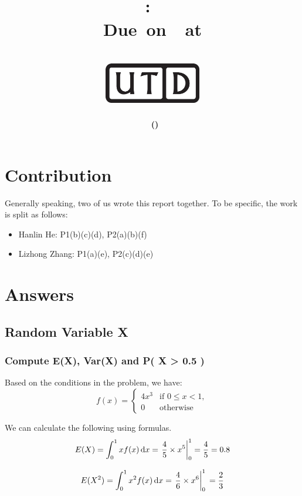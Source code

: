 \documentclass[12pt,letterpaper,titlepage,en-US]{article}
\title{
    \vspace{1in}
    \textmd{\textbf{\hmwkClassName \\\hmwkClass:\ \hmwkTitle }}\\
    \normalsize\vspace{0.1in}\small{Due\ on\ \DTMusedate{DueDate}\ at \DTMusetime{DueDate} }\\
    \vspace{0.1in}\large{\textit{\hmwkClassInstructor}}\\
    \vspace{0.5in}\includegraphics[height=2.4em]{UTD_logo_BW}\\
    \vspace{2in}
}
\author{\textbf{\hmwkAuthorName\ \footnotesize{(\hmwkAuthorNetID)}} \\ }
\date{}
\begin{document}
\maketitle


\tableofcontents

\pagebreak
{}


\section*{Contribution}
Generally speaking, two of us wrote this report together. To be specific, the work is split as follows:
\begin{itemize}
    \item Hanlin He: P1(b)(c)(d), P2(a)(b)(f)
    \item Lizhong Zhang: P1(a)(e), P2(c)(d)(e)
\end{itemize}
\section{Answers}
\subsection{Random Variable X}
\subsubsection{Compute E(X), Var(X) and P( X > 0.5 )}
Based on the conditions in the problem, we have:
\begin{equation}
f(x) = \begin{cases} 4x^3 & \text{if } 0 \leq x < 1,\\ 0 & \text{otherwise} \end{cases}
\end{equation}

We can calculate the following using formulas.
\begin{equation}
E(X) = \int_0^1 x f(x) \mathop{}\!\mathrm{d} x
     = \left.\frac{4}{5} \times x^5\right|_0^1
     = \frac{4}{5}
     = 0.8
\end{equation}

\begin{equation}
E(X^2) = \int_0^1 x^2 f(x) \mathop{}\!\mathrm{d} x \\
     = \left.\frac{4}{6} \times x^6\right|_0^1 \\
     = \frac{2}{3}
\end{equation}
\end{document}
